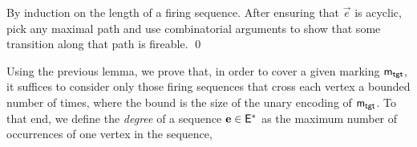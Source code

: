 \begin{proofSketch}
  By induction on the length of a firing sequence.
  After ensuring that $\vec{e}$ is acyclic, pick any maximal path and use combinatorial arguments
  to show that some transition along that path is fireable.
  \qed
\end{proofSketch}

Using the previous lemma, we prove that, in order to cover a given
marking $\mathsf{m}_\mathsf{tgt}$, it suffices to consider only those firing
sequences that cross each vertex a bounded number of times, where the
bound is the size of the unary encoding of $\mathsf{m}_\mathsf{tgt}$.
To that end, we define the \emph{degree} of a sequence $\mathbf{e} \in \mathsf{E}^*$
as the maximum number of occurrences of one vertex in the sequence, \ie
